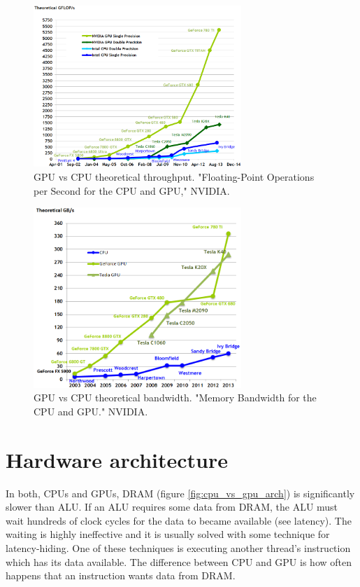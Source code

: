 \documentclass[12pt,oneside]{fithesis2}
\begin{document}
\begin{figure}[H]
	\centering
	\includegraphics[width=0.7\textwidth]{figures/floating-point-operations-per-second.png}
	\caption{GPU vs CPU theoretical throughput. "Floating-Point Operations per Second for the CPU and GPU," NVIDIA.~\cite{cuda_guide}}
	\label{fig:gpu_throughput}
\end{figure}

\begin{figure}[H]
	\centering
	\includegraphics[width=0.7\textwidth]{figures/memory-bandwidth.png}
	\caption{GPU vs CPU theoretical bandwidth. "Memory Bandwidth for the CPU and GPU." NVIDIA.~\cite{cuda_guide}}
	\label{fig:gpu_bandwith}
\end{figure}

\section{Hardware architecture}
\label{cuda_architecture}

In both, CPUs and GPUs, DRAM (figure \ref{fig:cpu_vs_gpu_arch}) is significantly slower than ALU. If an ALU requires some data from DRAM, the ALU must wait hundreds of clock cycles for the data to became available (see latency). The waiting is highly ineffective and it is usually solved with some technique for latency-hiding. One of these techniques is executing another thread's instruction which has its data available. The difference between CPU and GPU is how often happens that an instruction wants data from DRAM.
\end{document}
